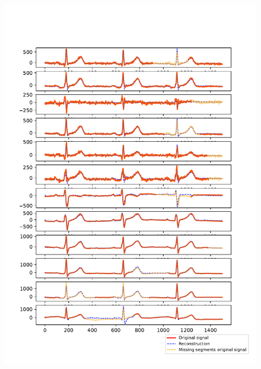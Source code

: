 \documentclass{mldsmsc}
\begin{document}
\begin{figure}[h!]
\centering
\begin{minipage}{0.4\linewidth}
    \centering
    \includegraphics[width=\linewidth]{images/missing/psmf_output_20_3_half.pdf}
\end{minipage}%
\hspace{0.05\linewidth}
\begin{minipage}{0.4\linewidth}
    \centering

\end{minipage}
\end{figure}
\end{document}
